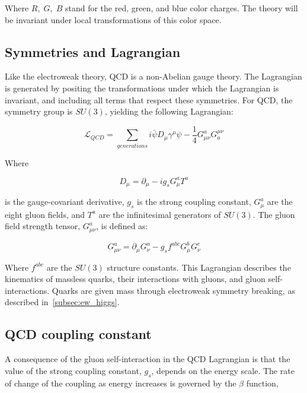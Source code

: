 Where $R,\;G,\;B$ stand for the red, green, and blue color charges.
The theory will be invariant under local transformations of this color space.

\subsection{Symmetries and Lagrangian}\label{subsec:qcd_lagrangian}

Like the electroweak theory, QCD is a non-Abelian gauge theory.
The Lagrangian is generated by positing the transformations under which the Lagrangian is invariant,
and including all terms that respect these symmetries.
For QCD, the symmetry group is $SU(3)$, yielding the following Lagrangian:

\begin{equation}\label{eq:qcd_lagrangian}
    \mathcal{L}_{QCD} = \sum_{generations}i\bar{\psi}D_\mu\gamma^\mu\psi-\frac{1}{4}G_{\mu\nu}^a G_a^{\mu\nu}
\end{equation}

Where

\begin{equation}\label{eq:qcd_deriv}
D_\mu = \partial_\mu - i g_s G_\mu^a T^a
\end{equation}

is the gauge-covariant derivative, $g_s$ is the strong coupling constant, $G_\mu^a$ are the eight gluon fields,
and $T^a$ are the infinitesimal generators of $SU(3)$.
The gluon field strength tensor, $G_{\mu\nu}^a$, is defined as:

\begin{equation}\label{eq:qcd_field_strength}
    G_{\mu\nu}^a = \partial_\mu G_\nu^a - g_s f^{abc} G_\mu^b G_\nu ^c
\end{equation}

Where $f^{abc}$ are the $SU(3)$ structure constants.
This Lagrangian describes the kinematics of massless quarks, their interactions with gluons, and gluon self-interactions.
Quarks are given mass through electroweak symmetry breaking, as described in~\ref{subsec:ew_higgs}.

\subsection{QCD coupling constant}\label{subsec:qcd_coupling}

A consequence of the gluon self-interaction in the QCD Lagrangian is that the value of the strong coupling constant,
$g_s$, depends on the energy scale.
The rate of change of the coupling as energy increases is governed by the $\beta$ function,

